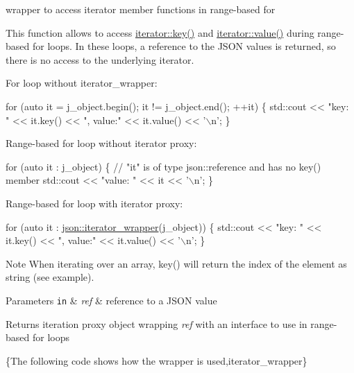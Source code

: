 wrapper to access iterator member functions in range-\/based for 

This function allows to access \hyperlink{classnlohmann_1_1detail_1_1iter__impl_ad14ac9338131d0be2c6bb41c715c2b27}{iterator\+::key()} and \hyperlink{classnlohmann_1_1detail_1_1iter__impl_adc4048d25e057ce8ec0b912642c24731}{iterator\+::value()} during range-\/based for loops. In these loops, a reference to the J\+S\+ON values is returned, so there is no access to the underlying iterator.

For loop without iterator\+\_\+wrapper\+:


\begin{DoxyCode}
\textcolor{keywordflow}{for} (\textcolor{keyword}{auto} it = j\_object.begin(); it != j\_object.end(); ++it)
\{
    std::cout << \textcolor{stringliteral}{"key: "} << it.key() << \textcolor{stringliteral}{", value:"} << it.value() << \textcolor{charliteral}{'\(\backslash\)n'};
\}
\end{DoxyCode}


Range-\/based for loop without iterator proxy\+:


\begin{DoxyCode}
\textcolor{keywordflow}{for} (\textcolor{keyword}{auto} it : j\_object)
\{
    \textcolor{comment}{// "it" is of type json::reference and has no key() member}
    std::cout << \textcolor{stringliteral}{"value: "} << it << \textcolor{charliteral}{'\(\backslash\)n'};
\}
\end{DoxyCode}


Range-\/based for loop with iterator proxy\+:


\begin{DoxyCode}
\textcolor{keywordflow}{for} (\textcolor{keyword}{auto} it : \hyperlink{classnlohmann_1_1basic__json_a5e4212986136ca1220f351c60e89906b}{json::iterator\_wrapper}(j\_object))
\{
    std::cout << \textcolor{stringliteral}{"key: "} << it.key() << \textcolor{stringliteral}{", value:"} << it.value() << \textcolor{charliteral}{'\(\backslash\)n'};
\}
\end{DoxyCode}


\begin{DoxyNote}{Note}
When iterating over an array, {\ttfamily key()} will return the index of the element as string (see example).
\end{DoxyNote}

\begin{DoxyParams}[1]{Parameters}
\mbox{\tt in}  & {\em ref} & reference to a J\+S\+ON value \\
\hline
\end{DoxyParams}
\begin{DoxyReturn}{Returns}
iteration proxy object wrapping {\itshape ref} with an interface to use in range-\/based for loops
\end{DoxyReturn}
\{The following code shows how the wrapper is used,iterator\+\_\+wrapper\}

